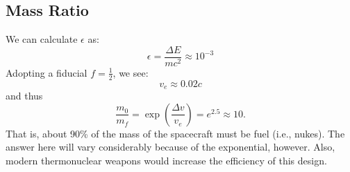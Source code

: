 \documentclass[a4paper]{article}
\begin{document}
    \subsection{Mass Ratio}
      We can calculate $\epsilon$ as:
      \begin{equation}
        \epsilon = \frac{\Delta E}{mc^2} \approx 10^{-3}
      \end{equation}
      Adopting a fiducial $f=\frac{1}{2}$, we see:
      \begin{equation}
        v_e \approx 0.02c
      \end{equation}
      and thus
      \begin{equation}
       \frac{m_{0}}{m_{f}} = \exp\left(\frac{\Delta v}{v_{e}}\right) = e^{2.5} \approx 10.
      \end{equation}
      That is, about 90\% of the mass of the spacecraft must be fuel (i.e., nukes).  The answer here will vary considerably because of the exponential, however.  Also, modern thermonuclear weapons would increase the efficiency of this design.
  
\end{document}
